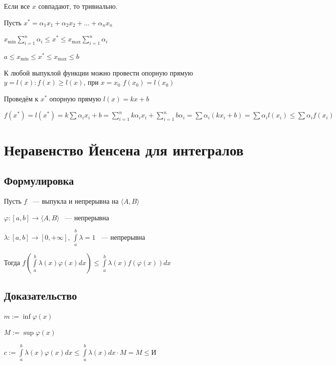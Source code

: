 \documentclass{article}
\begin{document}
            Если все $x$ совпадают, то тривиально.
            
            Пусть $x^* = \alpha_1 x_1 + \alpha_2 x_2 + \ldots + \alpha_n x_n$
            
            $x_{\min} \sum\limits_{i = 1}^n \alpha_i \leq x^* \leq x_{\max} \sum\limits_{i = 1}^n \alpha_i$
            
            $a \leq x_{\min} \leq x^* \leq x_{\max} \leq b$
            
            К любой выпуклой функции можно провести опорную прямую $y = l(x) : f(x) \geq l(x)$, при $x = x_0$ $f(x_0) = l(x_0)$
            
            Проведём к $x^*$ опорную прямую $l(x) = kx + b$
            
            $f(x^*) = l(x^*) = k \sum \alpha_i  x_i + b = \sum\limits_{i = 1}^n k \alpha_i x_i + \sum\limits_{i = 1}^n b \alpha_i = \sum \alpha_i (k x_i + b) = \sum \alpha_i l(x_i) \leq \sum \alpha_i f(x_i)$
            
    \newpage
    
    \section{Неравенство Йенсена для интегралов}
    
        \subsection{Формулировка}
        
            Пусть $f$ ~--- выпукла и непрерывна на $\langle A, B \rangle$
            
            $\varphi : [a, b] \rightarrow \langle A, B \rangle$ ~--- непрерывна
            
            $\lambda : [a, b] \rightarrow [0, +\infty]$, $\int\limits^b_a \lambda = 1$ ~--- непрерывна
            
            Тогда $f\left( \int\limits^b_a \lambda(x) \varphi(x) dx \right) \leq \int\limits^b_a \lambda(x) f(\varphi(x)) dx$
        \subsection{Доказательство}
        
            $m := \inf \varphi(x)$
            
            $M := \sup \varphi(x)$
            
            $c := \int\limits^b_a \lambda(x) \varphi(x) dx \leq \int\limits^b_a \lambda(x) dx \cdot M = M \leq И$
            
\end{document}
